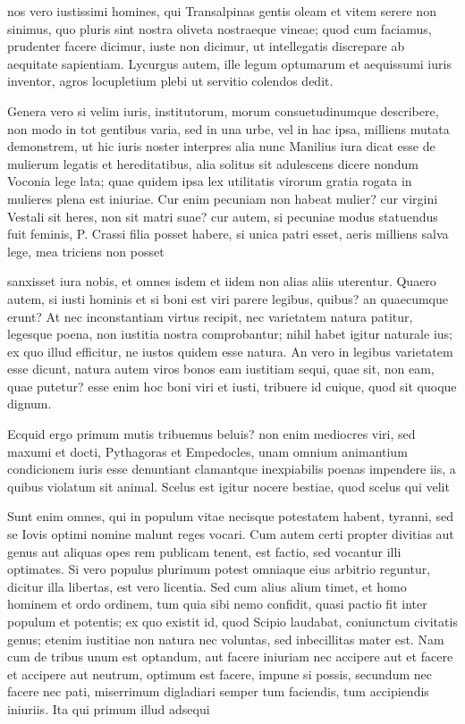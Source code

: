  nos vero iustissimi homines, qui Transalpinas gentis oleam et vitem serere non sinimus, quo pluris sint nostra oliveta nostraeque vineae; quod cum faciamus, prudenter facere dicimur, iuste non dicimur, ut intellegatis discrepare ab aequitate sapientiam. Lycurgus autem, ille legum optumarum et aequissumi iuris inventor, agros locupletium plebi ut servitio colendos dedit.

 Genera vero si velim iuris, institutorum, morum consuetudinumque describere, non modo in tot gentibus varia, sed in una urbe, vel in hac ipsa, milliens mutata demonstrem, ut hic iuris noster interpres alia nunc Manilius iura dicat esse de mulierum legatis et hereditatibus, alia solitus sit adulescens dicere nondum Voconia lege lata; quae quidem ipsa lex utilitatis virorum gratia rogata in mulieres plena est iniuriae. Cur enim pecuniam non habeat mulier? cur virgini Vestali sit heres, non sit matri suae? cur autem, si pecuniae modus statuendus fuit feminis, P. Crassi filia posset habere, si unica patri esset, aeris milliens salva lege, mea triciens non posset

 sanxisset iura nobis, et omnes isdem et iidem non alias aliis uterentur. Quaero autem, si iusti hominis et si boni est viri parere legibus, quibus? an quaecumque erunt? At nec inconstantiam virtus recipit, nec varietatem natura patitur, legesque poena, non iustitia nostra comprobantur; nihil habet igitur naturale ius; ex quo illud efficitur, ne iustos quidem esse natura. An vero in legibus varietatem esse dicunt, natura autem viros bonos eam iustitiam sequi, quae sit, non eam, quae putetur? esse enim hoc boni viri et iusti, tribuere id cuique, quod sit quoque dignum.

 Ecquid ergo primum mutis tribuemus beluis? non enim mediocres viri, sed maxumi et docti, Pythagoras et Empedocles, unam omnium animantium condicionem iuris esse denuntiant clamantque inexpiabilis poenas impendere iis, a quibus violatum sit animal. Scelus est igitur nocere bestiae, quod scelus qui velit

 Sunt enim omnes, qui in populum vitae necisque potestatem habent, tyranni, sed se Iovis optimi nomine malunt reges vocari. Cum autem certi propter divitias aut genus aut aliquas opes rem publicam tenent, est factio, sed vocantur illi optimates. Si vero populus plurimum potest omniaque eius arbitrio reguntur, dicitur illa libertas, est vero licentia. Sed cum alius alium timet, et homo hominem et ordo ordinem, tum quia sibi nemo confidit, quasi pactio fit inter populum et potentis; ex quo existit id, quod Scipio laudabat, coniunctum civitatis genus; etenim iustitiae non natura nec voluntas, sed inbecillitas mater est. Nam cum de tribus unum est optandum, aut facere iniuriam nec accipere aut et facere et accipere aut neutrum, optimum est facere, impune si possis, secundum nec facere nec pati, miserrimum digladiari semper tum faciendis, tum accipiendis iniuriis. Ita qui primum illud adsequi

